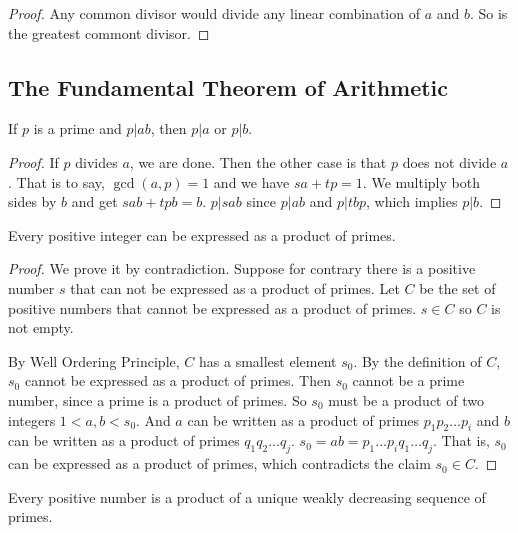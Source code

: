 \documentclass[11pt]{article}
\begin{document}
\begin{proof}
Any common divisor would divide any linear combination of $a$ and $b$. So is the greatest
commont divisor.
\end{proof}

\subsection{The Fundamental Theorem of Arithmetic}

\begin{lemma}
If $p$ is a prime and $p|ab$, then $p|a$ or $p|b$.
\end{lemma}

\begin{proof}
If $p$ divides $a$, we are done. Then the other case is that $p$ does not divide $a$. That
is to say, $\gcd(a,p)=1$ and we have $sa+tp=1$. We multiply both sides by $b$ and get
$sab+tpb=b$. $p|sab$ since $p|ab$ and $p|tbp$, which implies $p|b$.
\end{proof}

\begin{lemma} \label{lemma:9}
Every positive integer can be expressed as a product of primes.
\end{lemma}

\begin{proof}
We prove it by contradiction. Suppose for contrary there is a positive number $s$ that can
not be expressed as a product of primes. Let $C$ be the set of positive numbers that cannot
be expressed as a product of primes. $s \in C$ so $C$ is not empty.

By Well Ordering Principle, $C$ has a smallest element $s_0$. By the definition of $C$,
$s_0$ cannot be expressed as a product of primes. Then $s_0$ cannot be a prime number, since
a prime is a product of primes. So $s_0$ must be a product of two integers $1 < a,b < s_0$.
And $a$ can be written as a product of primes $p_1p_2 \dots p_i$ and $b$ can be written as a
product of primes $q_1q_2 \dots q_j$. $s_0 = ab = p_1 \dots p_iq_1 \dots q_j$. That is,
$s_0$ can be expressed as a product of primes, which contradicts the claim $s_0 \in C$.
\end{proof}

\begin{theorem}
Every positive number is a product of a unique weakly decreasing sequence of primes.
\end{theorem}
\end{document}
